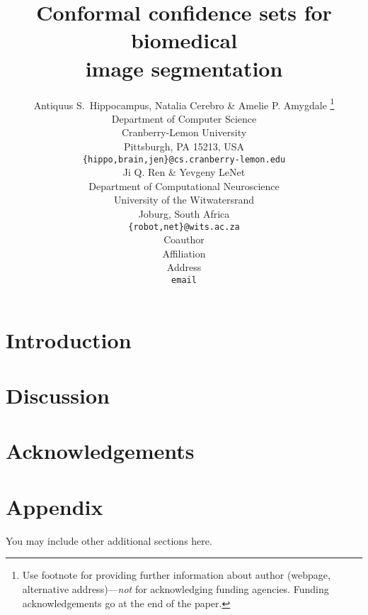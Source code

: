 \documentclass{article} %
\title{Conformal confidence sets for biomedical \\image segmentation}
\author{Antiquus S.~Hippocampus, Natalia Cerebro \& Amelie P. Amygdale \thanks{ Use footnote for providing further information
about author (webpage, alternative address)---\emph{not} for acknowledging
funding agencies.  Funding acknowledgements go at the end of the paper.} \\
Department of Computer Science\\
Cranberry-Lemon University\\
Pittsburgh, PA 15213, USA \\
\texttt{\{hippo,brain,jen\}@cs.cranberry-lemon.edu} \\
\And
Ji Q. Ren \& Yevgeny LeNet \\
Department of Computational Neuroscience \\
University of the Witwatersrand \\
Joburg, South Africa \\
\texttt{\{robot,net\}@wits.ac.za} \\
\AND
Coauthor \\
Affiliation \\
Address \\
\texttt{email}
}
\theoremstyle{definition}
\begin{document}
\maketitle

\begin{abstract}

\end{abstract}

\section{Introduction}



%
\section{Discussion}



\section*{Acknowledgements}





\appendix
\section{Appendix}
You may include other additional sections here.
\end{document}
